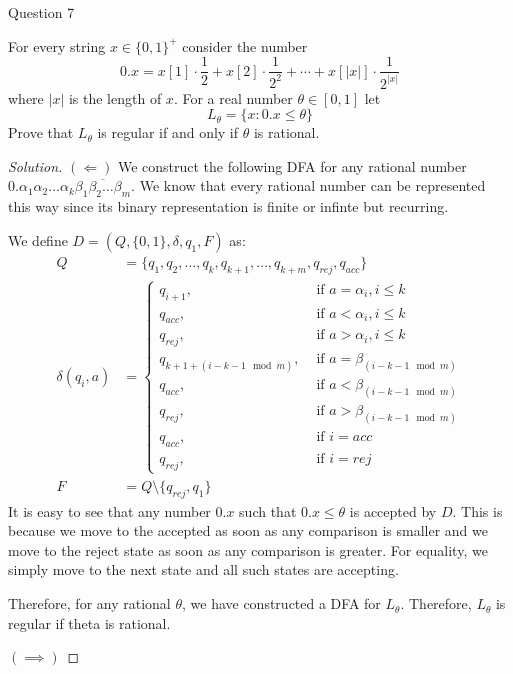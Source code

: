 \begin{solution}{Question 7}\label{ques:7}
    \begin{question}
      For every string $x\in \{0, 1\}^+$ consider the number
      \begin{equation*}
        0.x = x[1]\cdot\frac{1}{2} + x[2]\cdot\frac{1}{2^2} + \cdots + x[|x|]\cdot\frac{1}{2^{|x|}}
      \end{equation*}
      where $|x|$ is the length of $x$. For a real number $\theta\in [0, 1]$ let
      \begin{equation*}
        L_\theta = \{x: 0.x \leq \theta\}
      \end{equation*}
      Prove that $L_\theta$ is regular if and only if $\theta$ is rational.
    \end{question}
    \tcblower{}
    \begin{proof}[Solution]
      $(\Longleftarrow)$ We construct the following DFA for any rational number $0.\alpha_1\alpha_2\ldots\alpha_k\overline{\beta_1\beta_2\ldots\beta_m}$. We know that every rational number can be represented this way since its binary representation is finite or infinte but recurring.\par
      We define $D = (Q, \{0, 1\}, \delta, q_1, F)$ as:
      \begin{equation}
        \begin{split}
          Q &= \{q_1, q_2, \ldots, q_k, q_{k+1}, \ldots, q_{k+m}, q_{rej}, q_{acc}\}\\
          \delta(q_i, a) &=
          \begin{cases}
            q_{i+1}, &\text{ if }a = \alpha_i, i \leq k\\
            q_{acc}, &\text{ if }a < \alpha_i, i \leq k\\
            q_{rej}, &\text{ if }a > \alpha_i, i \leq k\\
            q_{k+1+(i-k-1\mod{m})}, &\text{ if }a = \beta_{(i-k-1\mod{m})}\\
            q_{acc}, &\text{ if }a < \beta_{(i-k-1\mod{m})}\\
            q_{rej}, &\text{ if }a > \beta_{(i-k-1\mod{m})}\\
            q_{acc}, &\text{ if }i = acc\\
            q_{rej}, &\text{ if }i = rej
          \end{cases}\\
          F &= Q \setminus \{q_{rej}, q_1\}
        \end{split}
      \end{equation}
      It is easy to see that any number $0.x$ such that $0.x \leq \theta$ is accepted by $D$. This is because we move to the accepted as soon as any comparison is smaller and we move to the reject state as soon as any comparison is greater. For equality, we simply move to the next state and all such states are accepting.\par
      Therefore, for any rational $\theta$, we have constructed a DFA for $L_\theta$. Therefore, $L_\theta$ is regular if theta is rational.\par
      $(\implies)$
    \end{proof}
\end{solution}
